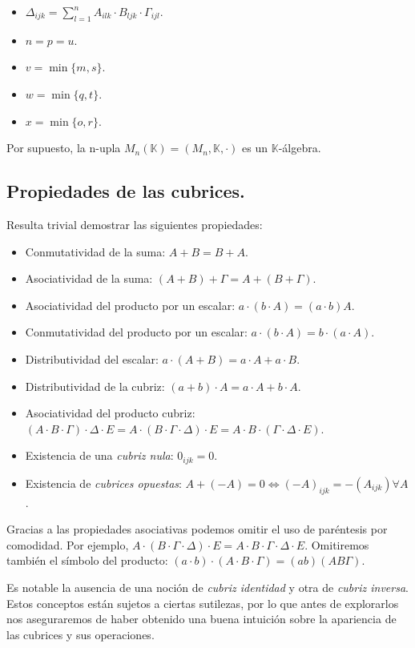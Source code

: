 \begin{itemize}
	\item $\Delta_{ijk} = \sum\limits_{l=1}^{n} A_{ilk} \cdot B_{ljk} \cdot \Gamma_{ijl}$.
	\item $n = p = u$.
	\item $v = \min\{m, s\}$.
	\item $w = \min\{q, t\}$.
	\item $x = \min\{o, r\}$.
\end{itemize}

Por supuesto, la n-upla $M_n (\mathbb{K}) = (M_n, \mathbb{K}, \cdot)$ es un $\mathbb{K}$-álgebra.

\subsection{Propiedades de las cubrices.}

Resulta trivial demostrar las siguientes propiedades:

\begin{itemize}
	\item Conmutatividad de la suma: $A + B = B + A$.
	\item Asociatividad de la suma: $(A + B) + \Gamma = A + (B + \Gamma)$.
	\item Asociatividad del producto por un escalar: $a\cdot (b\cdot A) = (a\cdot b)A$.
	\item Conmutatividad del producto por un escalar: $a\cdot (b\cdot A) = b\cdot (a\cdot A)$.
	\item Distributividad del escalar: $a\cdot (A + B) = a\cdot A + a\cdot B$.
	\item Distributividad de la cubriz: $(a + b)\cdot A = a\cdot A + b\cdot A$.
	\item Asociatividad del producto cubriz: $(A \cdot B \cdot \Gamma) \cdot \Delta \cdot E = A \cdot (B \cdot \Gamma \cdot \Delta) \cdot E = A \cdot B \cdot (\Gamma \cdot \Delta \cdot E)$.
	\item Existencia de una \textit{cubriz nula}: $0_{ijk} = 0$.
	\item Existencia de \textit{cubrices opuestas}: $A + (-A) = 0 \Leftrightarrow (-A)_{ijk} = -(A_{ijk}) \forall A$.
\end{itemize}

Gracias a las propiedades asociativas podemos omitir el uso de paréntesis por comodidad. Por ejemplo, $A \cdot (B \cdot \Gamma \cdot \Delta) \cdot E = A \cdot B \cdot \Gamma \cdot \Delta \cdot E$. Omitiremos también el símbolo del producto: $(a\cdot b)\cdot (A \cdot B \cdot \Gamma) = (ab)(AB\Gamma)$.

Es notable la ausencia de una noción de \textit{cubriz identidad} y otra de \textit{cubriz inversa}. Estos conceptos están sujetos a ciertas sutilezas, por lo que antes de explorarlos nos aseguraremos de haber obtenido una buena intuición sobre la apariencia de las cubrices y sus operaciones.
